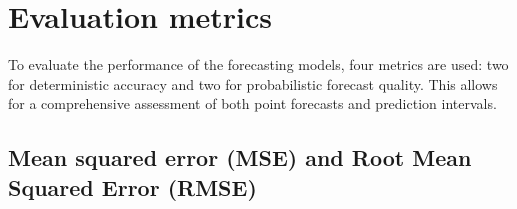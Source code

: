 \documentclass[class=scrbook, crop=false]{standalone}
\begin{document}







\section{Evaluation metrics}
\label{Section:Evaluation_Metrics}

To evaluate the performance of the forecasting models, four metrics are used: two for deterministic accuracy and two for probabilistic forecast quality. This allows for a comprehensive assessment of both point forecasts and prediction intervals.

\subsection{Mean squared error (MSE) and Root Mean Squared Error (RMSE)}
\end{document}
